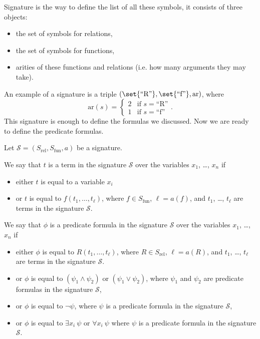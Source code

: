 Signature is the way to define the list of all these symbols, it consists of
three objects:
\begin{itemize}
  \item the set of symbols for relations,
  \item the set of symbols for functions,
  \item arities of these functions and relations (i.e. how many arguments they
    may take).
\end{itemize}
An example of a signature is a triple $(\set{\text{``R''}}, \set{\text{``f''}},
\mathrm{ar})$, where
\[
  \mathrm{ar}(s) = \begin{cases}
    2 & \text{if } s =  \text{``R''} \\
    1 & \text{if } s =  \text{``f''}
  \end{cases}.
\]
This signature is enough to define the formulas we discussed. Now we are ready
to define the predicate formulas.

\begin{definition}
  Let $\mathcal{S} = (S_\mathrm{rel}, S_\mathrm{fun}, a)$ be a signature.

  We say that $t$ is a term in the signature $\mathcal{S}$ over the variables
  $x_1$, \dots, $x_n$ if
  \begin{itemize}
    \item either $t$ is equal to a variable $x_i$
    \item or $t$ is equal to $f(t_1, \dots, t_\ell)$, where
      $f \in S_\mathrm{fun}$, $\ell = a(f)$, and $t_1$, \dots, $t_\ell$
      are terms in the signature $\mathcal{S}$.
  \end{itemize}

  We say that $\phi$ is a predicate formula in the signature $\mathcal{S}$
  over the variables $x_1$, \dots, $x_n$  if
  \begin{itemize}
    \item either $\phi$ is equal to $R(t_1, \dots, t_\ell)$, where
      $R \in S_\mathrm{rel}$, $\ell = a(R)$, and $t_1$, \dots, $t_\ell$
      are terms in the signature $\mathcal{S}$.
    \item or $\phi$ is equal to $(\psi_1 \land \psi_2)$ or
      $(\psi_1 \lor \psi_2)$, where $\psi_1$ and $\psi_2$ are predicate
      formulas in the signature $\mathcal{S}$,
    \item or $\phi$ is equal to $\lnot \psi$, where $\psi$ is a predicate
      formula in the signature $\mathcal{S}$,
    \item or $\phi$ is equal to $\exists x_i~\psi$ or $\forall x_i~\psi$ where
      $\psi$ is a predicate formula in the signature $\mathcal{S}$.
  \end{itemize}
\end{definition}

